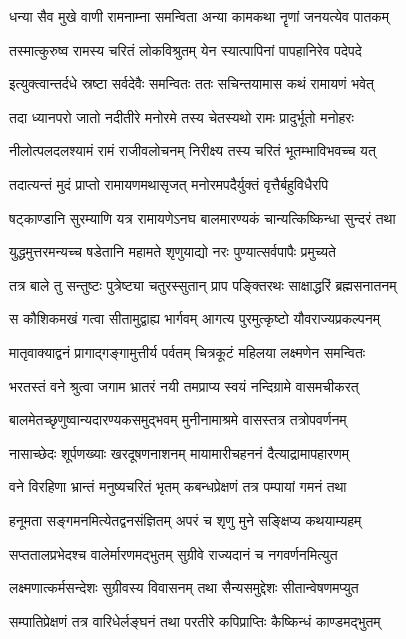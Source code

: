 \twolineshloka
{धन्या सैव मुखे वाणी रामनाम्ना समन्विता}
{अन्या कामकथा नॄणां जनयत्येव पातकम्}%

\twolineshloka
{तस्मात्कुरुष्व रामस्य चरितं लोकविश्रुतम्}
{येन स्यात्पापिनां पापहानिरेव पदेपदे}%

\twolineshloka
{इत्युक्त्वान्तर्दधे स्रष्टा सर्वदेवैः समन्वितः}
{ततः सचिन्तयामास कथं रामायणं भवेत्}%

\twolineshloka
{तदा ध्यानपरो जातो नदीतीरे मनोरमे}
{तस्य चेतस्यथो रामः प्रादुर्भूतो मनोहरः}%

\twolineshloka
{नीलोत्पलदलश्यामं रामं राजीवलोचनम्}
{निरीक्ष्य तस्य चरितं भूतम्भाविभवच्च यत्}%

\twolineshloka
{तदात्यन्तं मुदं प्राप्तो रामायणमथासृजत्}
{मनोरमपदैर्युक्तं वृत्तैर्बहुविधैरपि}%

\twolineshloka
{षट्काण्डानि सुरम्याणि यत्र रामायणेऽनघ}
{बालमारण्यकं चान्यत्किष्किन्धा सुन्दरं तथा}%

\twolineshloka
{युद्धमुत्तरमन्यच्च षडेतानि महामते}
{शृणुयाद्यो नरः पुण्यात्सर्वपापैः प्रमुच्यते}%

\twolineshloka
{तत्र बाले तु सन्तुष्टः पुत्रेष्ट्या चतुरस्सुतान्}
{प्राप पङ्क्तिरथः साक्षाद्धरिं ब्रह्मसनातनम्}%

\twolineshloka
{स कौशिकमखं गत्वा सीतामुद्वाह्य भार्गवम्}
{आगत्य पुरमुत्कृष्टो यौवराज्यप्रकल्पनम्}%

\twolineshloka
{मातृवाक्याद्वनं प्रागाद्गङ्गामुत्तीर्य पर्वतम्}
{चित्रकूटं महिलया लक्ष्मणेन समन्वितः}%

\twolineshloka
{भरतस्तं वने श्रुत्वा जगाम भ्रातरं नयी}
{तमप्राप्य स्वयं नन्दिग्रामे वासमचीकरत्}%

\twolineshloka
{बालमेतच्छृणुष्वान्यदारण्यकसमुद्भवम्}
{मुनीनामाश्रमे वासस्तत्र तत्रोपवर्णनम्}%

\twolineshloka
{नासाच्छेदः शूर्पणख्याः खरदूषणनाशनम्}
{मायामारीचहननं दैत्याद्रामापहारणम्}%

\twolineshloka
{वने विरहिणा भ्रान्तं मनुष्यचरितं भृतम्}
{कबन्धप्रेक्षणं तत्र पम्पायां गमनं तथा}%

\twolineshloka
{हनूमता सङ्गमनमित्येतद्वनसंज्ञितम्}
{अपरं च शृणु मुने सङ्क्षिप्य कथयाम्यहम्}%

\twolineshloka
{सप्ततालप्रभेदश्च वालेर्मारणमद्भुतम्}
{सुग्रीवे राज्यदानं च नगवर्णनमित्युत}%

\twolineshloka
{लक्ष्मणात्कर्मसन्देशः सुग्रीवस्य विवासनम्}
{तथा सैन्यसमुद्देशः सीतान्वेषणमप्युत}%

\twolineshloka
{सम्पातिप्रेक्षणं तत्र वारिधेर्लङ्घनं तथा}
{परतीरे कपिप्राप्तिः कैष्किन्धं काण्डमद्भुतम्}%

